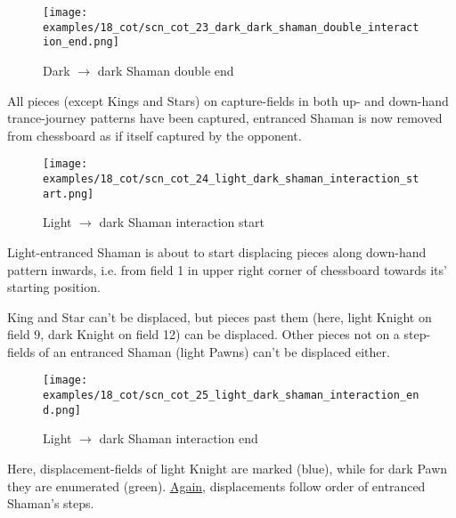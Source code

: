 \noindent
\begin{figure}[!h]
\texttt{[image: examples/18\_cot/scn\_cot\_23\_dark\_dark\_shaman\_double\_interaction\_end.png]}
\caption{Dark $\rightarrow$ dark Shaman double end}
\label{fig:scn_cot_23_dark_dark_shaman_double_interaction_end}
\end{figure}

All pieces (except Kings and Stars) on capture-fields in both up- and down-hand trance-journey
patterns have been captured, entranced Shaman is now removed from chessboard as if itself
captured by the opponent.

\clearpage %

\noindent
\begin{figure}[!h]
\texttt{[image: examples/18\_cot/scn\_cot\_24\_light\_dark\_shaman\_interaction\_start.png]}
\caption{Light $\rightarrow$ dark Shaman interaction start}
\label{fig:scn_cot_24_light_dark_shaman_interaction_start}
\end{figure}

Light-entranced Shaman is about to start displacing pieces along down-hand pattern inwards,
i.e. from field 1 in upper right corner of chessboard towards its' starting position.

King and Star can't be displaced, but pieces past them (here, light Knight on field 9, dark Knight
on field 12) can be displaced. Other pieces not on a step-fields of an entranced Shaman (light
Pawns) can't be displaced either.

\clearpage %

\noindent
\begin{figure}[!h]
\texttt{[image: examples/18\_cot/scn\_cot\_25\_light\_dark\_shaman\_interaction\_end.png]}
\caption{Light $\rightarrow$ dark Shaman interaction end}
\label{fig:scn_cot_25_light_dark_shaman_interaction_end}
\end{figure}

Here, displacement-fields of light Knight are marked (blue), while for dark Pawn they are
enumerated (green). \hyperref[fig:scn_cot_17_light_light_shaman_interaction_end]{Again}, displacements follow order of entranced Shaman's steps.

